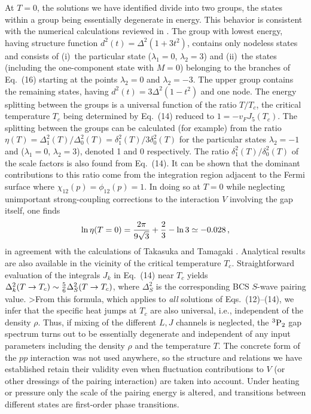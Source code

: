 At $T=0$, the solutions we have identified divide into two groups, 
the states within a group being essentially degenerate in energy.  
This behavior is consistent with the numerical calculations reviewed 
in \cite{tak}.  The group with lowest energy, having structure function 
$d^2(t)=\Delta^2(1+3t^2)$, contains only nodeless states and consists 
of (i)~the particular state ($\lambda_1=0$, $\lambda_2=3$) and 
(ii)~the states (including the one-component state with $M=0$) 
belonging to the branches of Eq.~(16) starting at the points 
$\lambda_2=0$ and $\lambda_2=-3$.  The upper group contains the 
remaining states, having $d^2(t)=3\Delta^2(1-t^2)$ and one node.
The energy splitting between the groups is a universal function of 
the ratio $T/T_c$, the critical temperature $T_c$ being determined
by Eq.~(14) reduced to $1=-v_FJ_5(T_c)$.
The splitting between the groups can be calculated (for example) 
from the ratio 
$\eta(T)=\Delta^2_1(T)/\Delta^2_0(T)=\delta^2_1(T)/3\delta^2_0(T)$ 
for the particular states $\lambda_2=-1$ and ($\lambda_1=0$, 
$\lambda_2=3$), denoted 1 and 0 respectively.
The ratio $\delta_1^2(T)/\delta^2_0(T)$ of the scale factors is also 
found from Eq.~(14). It can be shown that the dominant
contributions to this ratio come from the integration region adjacent 
to the Fermi surface where $\chi_{12}(p)=\phi_{12}(p)=1$. 
In doing so at $T=0$ while neglecting unimportant strong-coupling
corrections to the interaction $V$ involving the gap itself, one finds
\begin{equation}
 \ln\eta(T=0)={2\pi\over 9\sqrt{3}}+{2\over 3}-\ln 3\simeq -0.028 \, ,  
\end{equation}
in agreement with the calculations of Takasuka and Tamagaki \cite{tak}.
Analytical results are also available in the vicinity of the critical 
temperature $T_c$.  Straightforward evaluation of the integrals 
$J_k$ in Eq.~(14) near $T_c$ yields
$\Delta^2_k(T\rightarrow T_c)\sim {5\over 6}\Delta_S^2(T\rightarrow T_c)$,
where $ \Delta_S^2$ is the corresponding BCS $S$-wave pairing value.  
>From this formula, which applies to {\it all} solutions of 
Eqs.~(12)--(14), we infer that the specific heat jumps at $T_c$ 
are also universal, i.e., independent of the density $\rho$. 
Thus, if mixing of the different $L,J$ channels is neglected, 
the $^3{\rm P}_2$ gap spectrum turns out to be essentially degenerate 
and independent of any input parameters including the density $\rho$ 
and the temperature $T$.  The concrete form of the $pp$ interaction 
was not used anywhere, so the structure and relations we have established 
retain their validity even when fluctuation contributions to $V$ 
(or other dressings of the pairing interaction) are taken into account.  
Under heating or pressure only the scale of the pairing energy is 
altered, and transitions between different states are first-order 
phase transitions.

